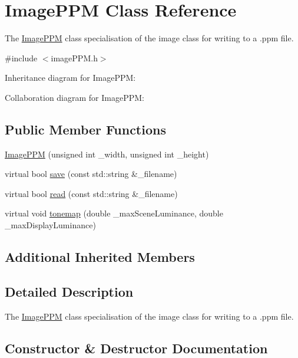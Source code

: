 \hypertarget{classImagePPM}{}\section{Image\+P\+P\+M Class Reference}
\label{classImagePPM}


The \hyperlink{classImagePPM}{Image\+P\+P\+M} class specialisation of the image class for writing to a .ppm file.  




{\ttfamily \#include $<$image\+P\+P\+M.\+h$>$}



Inheritance diagram for Image\+P\+P\+M\+:


Collaboration diagram for Image\+P\+P\+M\+:
\subsection*{Public Member Functions}
\begin{DoxyCompactItemize}
\item 
\hyperlink{classImagePPM_a11a311b9ba6382739eb75f7a15dc832b}{Image\+P\+P\+M} (unsigned int \+\_\+width, unsigned int \+\_\+height)
\item 
virtual bool \hyperlink{classImagePPM_acf4a44ec60de8ce19b826d51f82e9054}{save} (const std\+::string \&\+\_\+filename)
\item 
virtual bool \hyperlink{classImagePPM_a948a454964cd10c3eba73a4c5ecc27d6}{read} (const std\+::string \&\+\_\+filename)
\item 
virtual void \hyperlink{classImagePPM_a27820174d8704665b266e751a6919b53}{tonemap} (double \+\_\+max\+Scene\+Luminance, double \+\_\+max\+Display\+Luminance)
\end{DoxyCompactItemize}
\subsection*{Additional Inherited Members}


\subsection{Detailed Description}
The \hyperlink{classImagePPM}{Image\+P\+P\+M} class specialisation of the image class for writing to a .ppm file. 

\subsection{Constructor \& Destructor Documentation}
\hypertarget{classImagePPM_a11a311b9ba6382739eb75f7a15dc832b}{}
